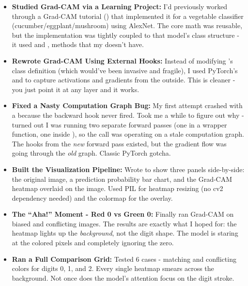 \documentclass[9pt,a4paper,twocolumn,twoside]{tau-class/tau}
\begin{document}
        \begin{itemize}
            \item \textbf{Studied Grad-CAM via a Learning Project:} I'd previously worked through a Grad-CAM tutorial () that implemented it for a vegetable classifier (cucumber/eggplant/mushroom) using AlexNet. The core math was reusable, but the implementation was tightly coupled to that model's class structure - it used  and , methods that my  doesn't have.

            \item \textbf{Rewrote Grad-CAM Using External Hooks:} Instead of modifying 's class definition (which would've been invasive and fragile), I used PyTorch's  and  to capture activations and gradients from the outside. This is cleaner - you just point it at any layer and it works.

            \item \textbf{Fixed a Nasty Computation Graph Bug:} My first attempt crashed with a  because the backward hook never fired. Took me a while to figure out why - turned out I was running two separate forward passes (one in a wrapper function, one inside ), so the  call was operating on a stale computation graph. The hooks from the \textit{new} forward pass existed, but the gradient flow was going through the \textit{old} graph. Classic PyTorch gotcha.

            \item \textbf{Built the Visualization Pipeline:} Wrote  to show three panels side-by-side: the original image, a prediction probability bar chart, and the Grad-CAM heatmap overlaid on the image. Used PIL for heatmap resizing (no cv2 dependency needed) and the  colormap for the overlay.

            \item \textbf{The ``Aha!'' Moment - Red 0 vs Green 0:} Finally ran Grad-CAM on biased and conflicting images. The results are exactly what I hoped for: the heatmap lights up the \textit{background}, not the digit shape. The model is staring at the colored pixels and completely ignoring the zero.

            \item \textbf{Ran a Full Comparison Grid:} Tested 6 cases - matching and conflicting colors for digits 0, 1, and 2. Every single heatmap smears across the background. Not once does the model's attention focus on the digit stroke.
        \end{itemize}
\end{document}
